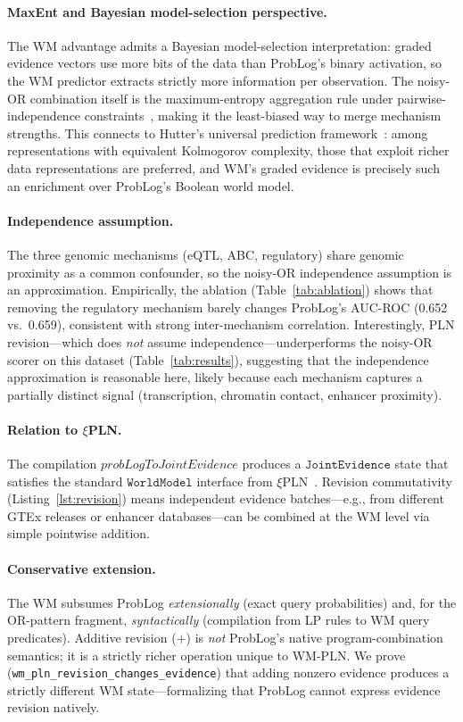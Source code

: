 \documentclass[]{article}
\newcommand{\xiPLN}{\texorpdfstring{$\xi$}{xi}\textup{PLN}}
\newcommand{\code}[1]{\texttt{#1}}
\newcommand{\ty}[1]{\ensuremath{\mathtt{#1}}}
\newcommand{\JointEvidence}{\ty{JointEvidence}}
\newcommand{\WorldModel}{\ty{WorldModel}}
\begin{document}
\paragraph{MaxEnt and Bayesian model-selection perspective.}
The WM advantage admits a Bayesian model-selection interpretation:
graded evidence vectors use more bits of the data than ProbLog's binary
activation, so the WM predictor extracts strictly more information per
observation.  The noisy-OR combination itself is the maximum-entropy
aggregation rule under pairwise-independence constraints~\cite{Pearl1988},
making it the least-biased way to merge mechanism strengths.  This
connects to Hutter's universal prediction framework~\cite{Hutter2005}:
among representations with equivalent Kolmogorov complexity, those that
exploit richer data representations are preferred, and WM's graded
evidence is precisely such an enrichment over ProbLog's Boolean world
model.

\paragraph{Independence assumption.}
The three genomic mechanisms (eQTL, ABC, regulatory) share genomic
proximity as a common confounder, so the noisy-OR independence
assumption is an approximation.  Empirically, the ablation
(Table~\ref{tab:ablation}) shows that removing the regulatory mechanism
barely changes ProbLog's AUC-ROC (0.652 vs.\ 0.659), consistent with
strong inter-mechanism correlation.  Interestingly, PLN revision---which
does \emph{not} assume independence---underperforms the noisy-OR scorer
on this dataset (Table~\ref{tab:results}), suggesting that the independence
approximation is reasonable here, likely because each mechanism captures
a partially distinct signal (transcription, chromatin contact, enhancer
proximity).

\paragraph{Relation to \xiPLN{}.}
The compilation $\mathit{probLogToJointEvidence}$ produces a \JointEvidence{}
state that satisfies the standard \WorldModel{} interface from
\xiPLN{}~\cite{xiPLN2026}.  Revision commutativity
(Listing~\ref{lst:revision}) means independent evidence batches---e.g., from
different GTEx releases or enhancer databases---can be combined at the WM level
via simple pointwise addition.

\paragraph{Conservative extension.}
The WM subsumes ProbLog \emph{extensionally} (exact query probabilities) and,
for the OR-pattern fragment, \emph{syntactically} (compilation from LP rules to
WM query predicates).  Additive revision ($+$) is \emph{not} ProbLog's native
program-combination semantics; it is a strictly richer operation unique to WM-PLN.
We prove (\code{wm\_pln\_revision\_changes\_evidence}) that adding nonzero evidence
produces a strictly different WM state---formalizing that ProbLog cannot express
evidence revision natively.
\end{document}
